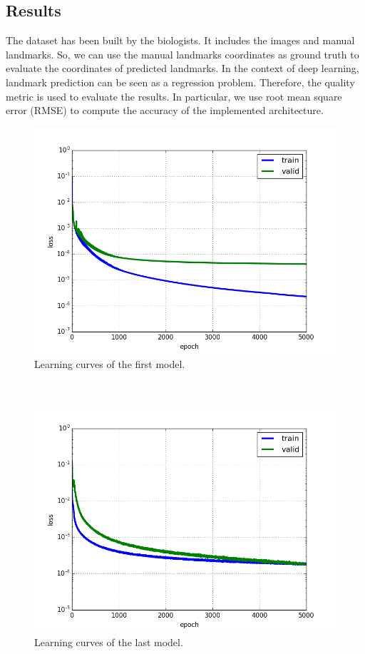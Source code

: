 \documentclass[conference]{IEEEtran}
\begin{document}
\subsection{Results}
The dataset has been built by the biologists. It includes the images and manual landmarks. So, we can use the manual landmarks coordinates as ground truth to evaluate the coordinates of predicted landmarks. In the context of deep learning, landmark prediction can be seen as a regression problem. Therefore, the quality metric is used to evaluate the results. In particular, we use root mean square error (RMSE) to compute the accuracy of the implemented architecture. 
\begin{figure}[h!]
	\centerline{\includegraphics[scale=0.45]{images/loss_model_1}}
	\caption{Learning curves of the first model.}
	\label{figloss1}
\end{figure}~\\
\begin{figure}[h!]
	\centerline{\includegraphics[scale=0.45]{images/loss_v16}}
	\caption{Learning curves of the last model.}
	\label{figloss}
\end{figure}~\\[0.1cm]
\end{document}
